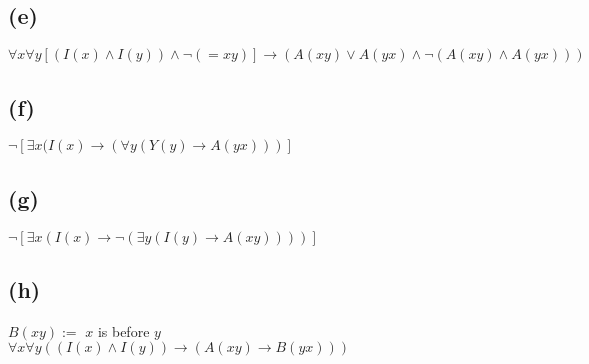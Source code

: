 \documentclass[11pt, a4paper, oneside]{article}
\begin{document}
\subsection*{(e)}
$\forall x \forall y [(I(x) \land I(y)) \land \neg (=xy)] \to (A(xy) \lor A(yx) \land \neg (A(xy) \land A(yx)))$
\subsection*{(f)}
$\neg [\exists x (I(x) \to (\forall y (Y(y) \to A(yx)))]$
\subsection*{(g)}
$\neg [\exists x (I(x) \to \neg (\exists y (I(y) \to A(xy))))]$
\subsection*{(h)}
$B(xy) :=$ $x$ is before $y$\\
$\forall x \forall y ((I(x) \land I(y)) \to (A(xy) \to B(yx)))$
\end{document}
